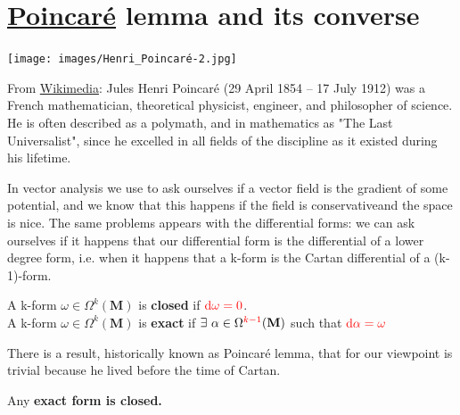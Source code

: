 \documentclass[../main.tex]{subfiles}
\begin{document}
\section{\href{https://it.wikipedia.org/wiki/Henri_Poincar\%C3\%A9}{Poincaré} lemma and its converse}
\begin{marginfigure}[-20mm]
	\texttt{[image: images/Henri\_Poincaré-2.jpg]}
	\caption[Photo of Poincaré]{From \href{https://commons.wikimedia.org/wiki/File:Henri_Poincar\%C3\%A9-2.jpg?uselang=it}{Wikimedia}: Jules Henri Poincaré (29 April 1854 – 17 July 1912) was a French mathematician, theoretical physicist, engineer, and philosopher of science. He is often described as a polymath, and in mathematics as "The Last Universalist", since he excelled in all fields of the discipline as it existed during his lifetime.}
\end{marginfigure}
In vector analysis we use to ask ourselves if a vector field is the gradient of some potential, and we know that this happens if the field is conservativeand the space is nice. The same problems appears with the differential forms: we can ask ourselves if it happens that our differential form is the differential of a lower degree form, i.e. when it happens that a k-form is the Cartan differential of a (k-1)-form.
\begin{kaobox}[frametitle=Terminology]
A k-form $\omega\in\Omega^k(\mathbf{M})$ is \textbf{closed} if ${\color{red}\textrm{d}\omega=0}$.\\
A k-form $\omega\in\Omega^k(\mathbf{M})$ is \textbf{exact} if $\exists \ \alpha\in\Omega^{\color{red}k-1}(\mathbf{M})$ such that ${\color{red}\textrm{d}\alpha=\omega}$
\end{kaobox}
There is a result, historically known as Poincaré lemma, that for our viewpoint is trivial because he lived before the time of Cartan.
\begin{lemma}
Any \textbf{exact form is closed.}
\end{lemma}
\end{document}
